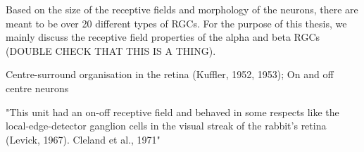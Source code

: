 Based on the size of the receptive fields and morphology of the neurons, there are meant to be over 20 different types of RGCs. For the purpose of this thesis, we mainly discuss the receptive field properties of the alpha and beta RGCs (DOUBLE CHECK THAT THIS IS A THING).

Centre-surround organisation in the retina (Kuffler, 1952, 1953); On and off centre neurons

"This unit had an on-off receptive field and behaved in some respects like the local-edge-detector ganglion cells in the visual streak of the rabbit's retina (Levick, 1967). Cleland et al., 1971"